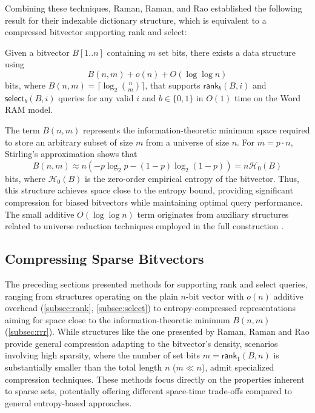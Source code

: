 Combining these techniques, Raman, Raman, and Rao established the following result for their indexable dictionary structure, which is equivalent to a compressed bitvector supporting rank and select:

\begin{theorem} \label{th:rrr}
    Given a bitvector $B[1..n]$ containing $m$ set bits, there exists a data structure using
    $$B(n, m) + o(n) + O(\log \log n)$$
    bits, where $B(n,m) = \lceil \log_2 \binom{n}{m} \rceil$, that supports $\textsf{rank}_b(B, i)$ and $\textsf{select}_b(B, i)$ queries for any valid $i$ and $b \in \{0,1\}$ in $O(1)$ time on the Word RAM model.
\end{theorem}

The term $B(n,m)$ represents the information-theoretic minimum space required to store an arbitrary subset of size $m$ from a universe of size $n$. For $m = p \cdot n$, Stirling's approximation shows that
$$B(n, m) \approx n(-p \log_2 p - (1-p) \log_2(1-p)) = n \mathcal{H}_0(B)$$
bits, where $\mathcal{H}_0(B)$ is the zero-order empirical entropy of the bitvector. Thus, this structure achieves space close to the entropy bound, providing significant compression for biased bitvectors while maintaining optimal query performance. The small additive $O(\log \log n)$ term originates from auxiliary structures related to universe reduction techniques employed in the full construction \cite{RRR2002}.

\subsection{Compressing Sparse Bitvectors} \label{subsec:elias_fano_compression}

The preceding sections presented methods for supporting \textsf{rank} and \textsf{select} queries, ranging from structures operating on the plain $n$-bit vector with $o(n)$ additive overhead (\ref{subsec:rank}, \ref{subsec:select}) to entropy-compressed representations aiming for space close to the information-theoretic minimum $B(n,m)$ (\ref{subsec:rrr}). While structures like the one presented by Raman, Raman and Rao provide general compression adapting to the bitvector's density, scenarios involving high sparsity, where the number of set bits $m = \textsf{rank}_1(B, n)$ is substantially smaller than the total length $n$ ($m \ll n$), admit specialized compression techniques. These methods focus directly on the properties inherent to sparse sets, potentially offering different space-time trade-offs compared to general entropy-based approaches.

